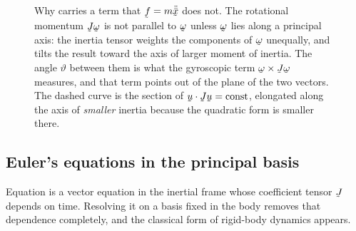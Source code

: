 \begin{figure}[htbp]\centering
\renewcommand{\thefigure}{A}
\caption{Why  carries a term that $\vek{f}=m\ddot{\bar{\bx}}$
does not. The rotational momentum $\vek{J}\bom$ is not parallel to
$\bom$ unless $\bom$ lies along a principal axis: the inertia tensor
weights the components of $\bom$ unequally, and tilts the result toward
the axis of larger moment of inertia. The angle $\vartheta$ between them
is what the gyroscopic term $\bom\times\vek{J}\bom$ measures, and that
term points out of the plane of the two vectors. The dashed curve is the
section of $\ip\bu{\vek{J}\bu}=\text{const}$, elongated along the axis
of \emph{smaller} inertia because the quadratic form is smaller there.}
\label{fig:ch6inertia}
\end{figure}

\subsection*{Euler's equations in the principal basis}

Equation  is a vector equation in the inertial frame whose
coefficient tensor $\vek{J}$ depends on time. Resolving it on a basis
fixed in the body removes that dependence completely, and the classical
form of rigid-body dynamics appears.

